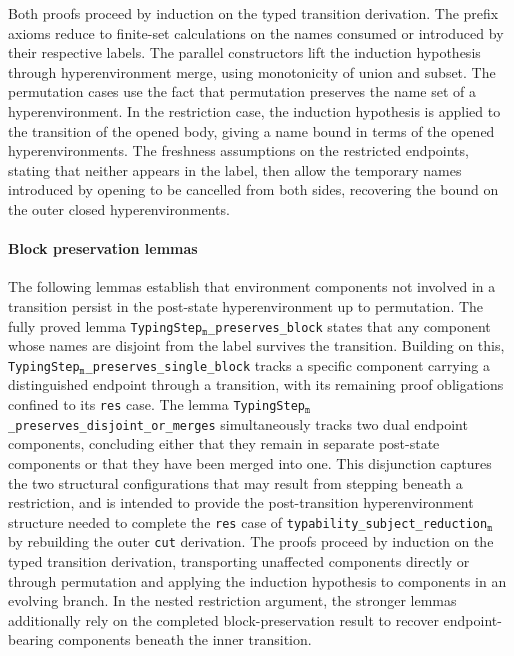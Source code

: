 Both proofs proceed by induction on the typed transition derivation. The prefix axioms reduce to finite-set calculations on the names consumed or introduced by their respective labels. The parallel constructors lift the induction hypothesis through hyperenvironment merge, using monotonicity of union and subset. The permutation cases use the fact that permutation preserves the name set of a hyperenvironment. In the restriction case, the induction hypothesis is applied to the transition of the opened body, giving a name bound in terms of the opened hyperenvironments. The freshness assumptions on the restricted endpoints, stating that neither appears in the label, then allow the temporary names introduced by opening to be cancelled from both sides, recovering the bound on the outer closed hyperenvironments.

\paragraph{Block preservation lemmas}
The following lemmas establish that environment components not involved in a transition persist in the post-state hyperenvironment up to permutation. The fully proved lemma \texttt{TypingStep}$_{\texttt{m}}$\texttt{\_preserves\_block} states that any component whose names are disjoint from the label survives the transition. Building on this, \texttt{TypingStep}$_{\texttt{m}}$\texttt{\_preserves\_single\_block} tracks a specific component carrying a distinguished endpoint through a transition, with its remaining proof obligations confined to its \texttt{res} case. The lemma \texttt{TypingStep}$_{\texttt{m}}$\texttt{\_preserves\_disjoint\_or\_merges} simultaneously tracks two dual endpoint components, concluding either that they remain in separate post-state components or that they have been merged into one. This disjunction captures the two structural configurations that may result from stepping beneath a restriction, and is intended to provide the post-transition hyperenvironment structure needed to complete the \texttt{res} case of \texttt{typability\_subject\_reduction}$_{\texttt{m}}$ by rebuilding the outer \texttt{cut} derivation. The proofs proceed by induction on the typed transition derivation, transporting unaffected components directly or through permutation and applying the induction hypothesis to components in an evolving branch. In the nested restriction argument, the stronger lemmas additionally rely on the completed block-preservation result to recover endpoint-bearing components beneath the inner transition.

